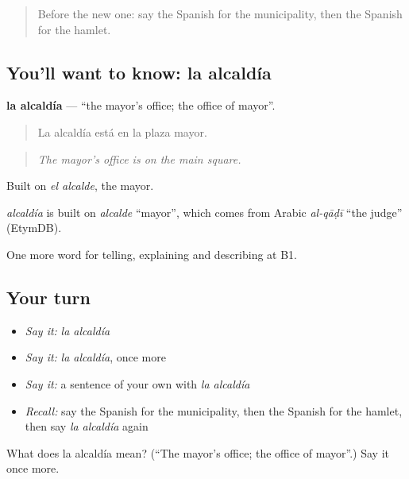 \label{lesson:ES-C683-alcaldia}



\begin{quote}
Before the new one: say the Spanish for the municipality, then the Spanish for the hamlet.
\end{quote}

\subsection*{You'll want to know: la alcaldía}
\textbf{la alcaldía} — \textquotedblleft{}the mayor’s office; the office of mayor\textquotedblright{}.

\begin{quote}
La alcaldía está en la plaza mayor.
\end{quote}

\begin{quote}
\emph{The mayor’s office is on the main square.}
\end{quote}

Built on \emph{el alcalde}, the mayor.

\begin{cousinweb}
\emph{alcaldía} is built on \emph{alcalde} \textquotedblleft{}mayor\textquotedblright{}, which comes from Arabic \emph{al-qāḍī} \textquotedblleft{}the judge\textquotedblright{} (EtymDB).
\end{cousinweb}

\begin{grammarlens}[title={What you've built}]
One more word for telling, explaining and describing at B1.
\end{grammarlens}

\subsection*{Your turn}
\begin{itemize}
\raggedright
  \item \emph{Say it:} \emph{la alcaldía}
  \item \emph{Say it:} \emph{la alcaldía}, once more
  \item \emph{Say it:} a sentence of your own with \emph{la alcaldía}
  \item \emph{Recall:} say the Spanish for the municipality, then the Spanish for the hamlet, then say \emph{la alcaldía} again
\end{itemize}

\begin{tcolorbox}[breakable,colback=teal!4,colframe=teal!35!black,title={Before you move on}]
What does la alcaldía mean? (\textquotedblleft{}The mayor’s office; the office of mayor\textquotedblright{}.) Say it once more.
\end{tcolorbox}
